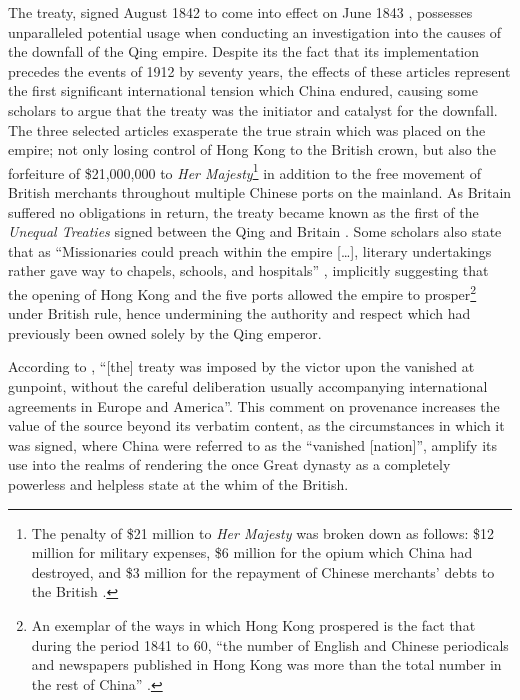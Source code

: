\documentclass{article}
\begin{document}
        The treaty, signed  August 1842 to come into effect on  June 1843 \autocite{Saw:1975}, possesses unparalleled potential usage when conducting an investigation into the causes of the downfall of the Qing empire. Despite its the fact that its implementation precedes the events of 1912 by seventy years, the effects of these articles represent the first significant international tension which China endured, causing some scholars to argue that the treaty was the initiator and catalyst for the downfall. The three selected articles exasperate the true strain which was placed on the empire; not only losing control of Hong Kong to the British crown, but also the forfeiture of \$21,000,000 to \textit{Her Majesty}\footnote{The penalty of \$21 million to \textit{Her Majesty} was broken down as follows: \$12 million for military expenses, \$6 million for the opium which China had destroyed, and \$3 million for the repayment of Chinese merchants' debts to the British \autocite{Hsu:1999}.} in addition to the free movement of British merchants throughout multiple Chinese ports on the mainland. As Britain suffered no obligations in return, the treaty became known as the first of the \textit{Unequal Treaties} signed between the Qing and Britain \autocite{Hoe:1999}. Some scholars also state that as ``Missionaries could preach within the empire [\ldots], literary undertakings rather gave way to chapels, schools, and hospitals'' \autocite{Britton:1933}, implicitly suggesting that the opening of Hong Kong and the five ports allowed the empire to prosper\footnote{An exemplar of the ways in which Hong Kong prospered is the fact that during the period 1841 to 60, ``the number of English and Chinese periodicals and newspapers published in Hong Kong was more than the total number in the rest of China'' \autocite{Huang:2001}.} under British rule, hence undermining the authority and respect which had previously been owned solely by the Qing emperor.

        According to \autocite{Hsu:1999}, ``[the] treaty was imposed by the victor upon the vanished at gunpoint, without the careful deliberation usually accompanying international agreements in Europe and America''. This comment on provenance increases the value of the source beyond its verbatim content, as the circumstances in which it was signed, where China were referred to as the ``vanished [nation]'', amplify its use into the realms of rendering the once Great dynasty as a completely powerless and helpless state at the whim of the British.
\end{document}
